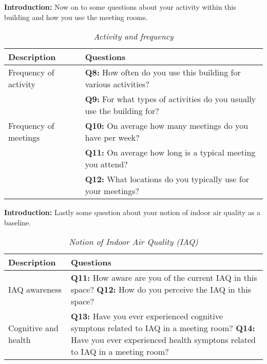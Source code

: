 \begin{appendices}
\begin{table}[htbp]
    \captionsetup{justification=raggedright,singlelinecheck=false}
    \caption{\textit{Activity and frequency}}
    \label{tab:column_widths}
    \raggedright \textbf{Introduction:} Now on to some questions about your activity within this building and how you use the meeting rooms.
    \begin{tabularx}{\textwidth}{|p{}|X|}
        \hline
        \textbf{Description} & \textbf{Questions} \\
        \hline
        Frequency of activity & \textbf{Q8:} How often do you use this building for various activities? \\
        & \textbf{Q9:} For what types of activities do you usually use the building for? \\
        \hline
        Frequency of meetings & \textbf{Q10:} On average how many meetings do you have per week? \\
        & \textbf{Q11:} On average how long is a typical meeting you attend? \\
        & \textbf{Q12:} What locations do you typically use for your meetings? \\
        \hline
    \end{tabularx}
\end{table}

\begin{table}[htbp]
    \captionsetup{justification=raggedright,singlelinecheck=false}
    \caption{\textit{Notion of Indoor Air Quality (IAQ)}}
    \label{tab:column_widths}
    \raggedright \textbf{Introduction:} Lastly some question about your notion of indoor air quality as a baseline.
    \begin{tabularx}{\textwidth}{|p{}|X|}
        \hline
        \textbf{Description} & \textbf{Questions} \\
        \hline
        IAQ awareness & \textbf{Q11:} How aware are you of the current IAQ in this space? 
        \newline
        \textbf{Q12:} How do you perceive the IAQ in this space? \\
        \hline
        Cognitive and health & \textbf{Q13:} Have you ever experienced cognitive symptons related to IAQ in a meeting room? 
        \newline
        \textbf{Q14:} Have you ever experienced health symptons related to IAQ in a meeting room?  \\
        \hline
    \end{tabularx}
\end{table}


\end{appendices}
